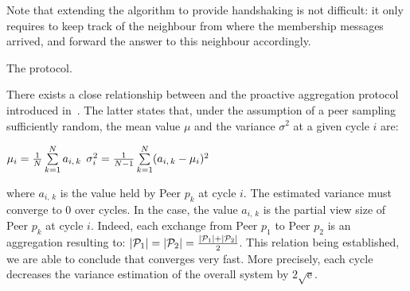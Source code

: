 Note that extending the algorithm to provide handshaking is not difficult: it
only requires to keep track of the neighbour from where the membership messages
arrived, and forward the answer to this neighbour accordingly.

\begin{algorithm}
  
  \caption{\label{algo:scamplon}The \SCAMPLON{} protocol.}
\end{algorithm}

There exists a close relationship between \SCAMPLON{} and the proactive
aggregation protocol introduced
in~\cite{jelasity2004epidemic,montresor2004robust}. The latter states that,
under the assumption of a peer sampling sufficiently random, the mean value
$\mu$ and the variance $\sigma^2$ at a given cycle $i$ are:
\begin{center}
  $\mu_i = {1\over{N}} \sum\limits_{k=1}^{N} a_{i,\,k}$ \hfill 
  $\sigma^2_i = {1\over{N-1}}\sum\limits_{k=1}^N (a_{i,\,k} - \mu_i)^2$
\end{center}
where $a_{i,\,k}$ is the value held by Peer $p_k$ at cycle $i$. The estimated
variance must converge to $0$ over cycles. In the \SCAMPLON{} case, the value
$a_{i,\,k}$ is the partial view size of Peer $p_k$ at cycle $i$. Indeed, each
exchange from Peer $p_1$ to Peer $p_2$ is an aggregation resulting to:
$|\mathcal{P}_1|=|\mathcal{P}_2|={|\mathcal{P}_1| + |\mathcal{P}_2| \over{2}}$.
This relation being established, we are able to conclude that \SCAMPLON{}
converges very fast. More precisely, each cycle decreases the variance
estimation of the overall system by ${2\sqrt{\text{e}}}$.

